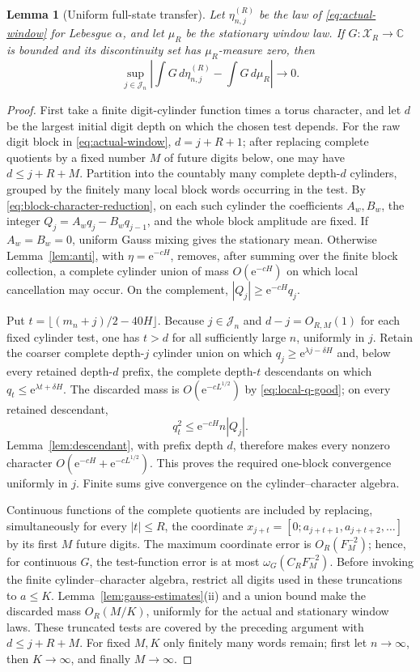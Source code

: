 \documentclass[11pt,a4paper]{amsart}
\newtheorem{lemma}[theorem]{Lemma}
\theoremstyle{definition}
\theoremstyle{remark}
\newcommand{\e}{\mathrm e}
\begin{document}
\begin{lemma}[Uniform full-state transfer]\label{lem:full-state}
Let $\eta_{n,j}^{(R)}$ be the law of \eqref{eq:actual-window} for Lebesgue
$\alpha$, and let $\mu_R$ be the stationary window law.  If
$G:\mathcal X_R\to\mathbb C$ is bounded and its discontinuity set has
$\mu_R$-measure zero, then
\begin{equation}\label{eq:full-state}
 \sup_{j\in\mathcal J_n}
 \left|\int G\,d\eta_{n,j}^{(R)}-\int G\,d\mu_R\right|\longrightarrow0.
\end{equation}
\end{lemma}

\begin{proof}
First take a finite digit-cylinder function times a torus character, and let
$d$ be the largest initial digit depth on which the chosen test depends.  For
the raw digit block in \eqref{eq:actual-window}, $d=j+R+1$; after replacing
complete quotients by a fixed number $M$ of future digits below, one may have
$d\le j+R+M$.  Partition into the countably many complete depth-$d$
cylinders, grouped by the finitely many local block words occurring in the
test.  By \eqref{eq:block-character-reduction}, on each such cylinder the coefficients
$A_w,B_w$, the integer $Q_j=A_wq_j-B_wq_{j-1}$, and the whole block amplitude
are fixed.  If $A_w=B_w=0$, uniform Gauss mixing gives the stationary mean.
Otherwise Lemma~\ref{lem:anti}, with $\eta=\e^{-cH}$, removes, after summing
over the finite block collection, a complete cylinder union of mass
$O(\e^{-cH})$ on which local cancellation may occur.  On the complement,
$|Q_j|\ge\e^{-cH}q_j$.

Put $t=\lfloor(m_n+j)/2-40H\rfloor$.  Because
$j\in\mathcal J_n$ and $d-j=O_{R,M}(1)$ for each fixed cylinder test, one has
$t>d$ for all sufficiently large $n$, uniformly in $j$.  Retain the coarser complete depth-$j$
cylinder union on which $q_j\ge\e^{\lambda j-\delta H}$ and, below every
retained depth-$d$ prefix, the complete depth-$t$ descendants on
which $q_t\le\e^{\lambda t+\delta H}$.  The
discarded mass is $O(\e^{-cL^{1/2}})$ by
\eqref{eq:local-q-good}; on every retained descendant,
\[
 q_t^2\le\e^{-cH}n|Q_j|.
\]
Lemma~\ref{lem:descendant}, with prefix depth $d$, therefore makes every
nonzero character
$O(\e^{-cH}+\e^{-cL^{1/2}})$.  This proves the required one-block convergence
uniformly in $j$.  Finite sums give convergence on the cylinder--character
algebra.

Continuous functions of the complete quotients are included by replacing,
simultaneously for every $|t|\le R$, the coordinate
$x_{j+t}=[0;a_{j+t+1},a_{j+t+2},\ldots]$ by its first $M$ future digits.
The maximum coordinate error is $O_R(F_M^{-2})$; hence, for continuous $G$,
the test-function error is at most $\omega_G(C_RF_M^{-2})$.  Before invoking
the finite cylinder--character algebra, restrict all digits used in these
truncations to $a\le K$.  Lemma~\ref{lem:gauss-estimates}(ii) and a union bound
make the discarded mass $O_R(M/K)$, uniformly for the actual and stationary
window laws.  These truncated tests are covered by the preceding argument
with $d\le j+R+M$.  For fixed $M,K$ only finitely many words remain; first let
$n\to\infty$, then $K\to\infty$, and finally $M\to\infty$.


\end{proof}
\end{document}
